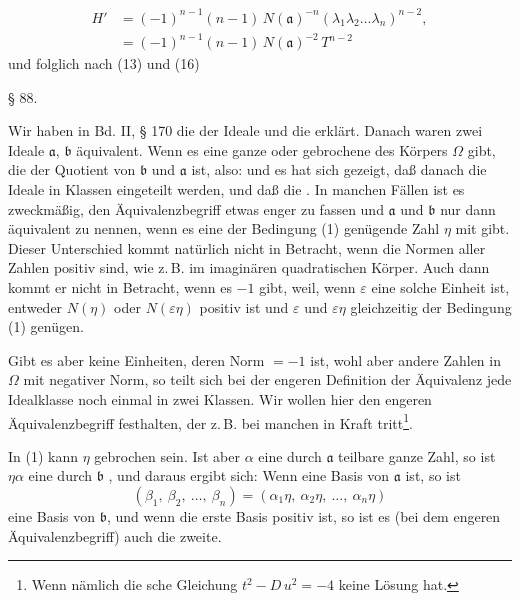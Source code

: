 \[
\begin{aligned}
H' &= (-1)^{n-1}(n-1)\,N(\mathfrak{a})^{-n}(\lambda_1\lambda_2\ldots\lambda_n)^{n-2}, \\
&= (-1)^{n-1}(n-1)\,N(\mathfrak{a})^{-2}\,T^{n-2}
\end{aligned}
\]
und folglich nach (13) und (16)

\begin{center}
§ 88. 
\end{center}

Wir haben in Bd. II, § 170 die  der Ideale und die  erklärt. Danach waren zwei Ideale $\mathfrak{a}$, $\mathfrak{b}$ äquivalent. Wenn es eine ganze oder gebrochene  des Körpers $\Omega$ gibt, die der Quotient von $\mathfrak{b}$ und $\mathfrak{a}$ ist, also:
und es hat sich gezeigt, daß danach die Ideale in Klassen eingeteilt werden, und daß die . In manchen Fällen ist es zweckmäßig, den Äquivalenzbegriff etwas enger zu fassen und $\mathfrak{a}$ und $\mathfrak{b}$ nur dann äquivalent zu nennen, wenn es eine der Bedingung (1) genügende Zahl $\eta$ mit  gibt. Dieser Unterschied kommt natürlich nicht in Betracht, wenn die Normen aller Zahlen positiv sind, wie z.\,B. im imaginären quadratischen Körper. Auch dann kommt er nicht in Betracht, wenn es  $-1$ gibt, weil, wenn $\varepsilon$ eine solche Einheit ist, entweder $N(\eta)$ oder $N(\varepsilon\eta)$ positiv ist und $\varepsilon$ und $\varepsilon\eta$ gleichzeitig der Bedingung (1) genügen.

Gibt es aber keine Einheiten, deren Norm $=-1$ ist, wohl aber andere Zahlen in $\Omega$ mit negativer Norm, so teilt sich bei der engeren Definition der Äquivalenz jede Idealklasse noch einmal in zwei Klassen. Wir wollen hier den engeren Äquivalenzbegriff festhalten, der z.\,B. bei manchen  in Kraft tritt\footnote{Wenn nämlich die sche Gleichung $t^2 - D\,u^2 = -4$ keine Lösung hat.}.

In (1) kann $\eta$ gebrochen sein. Ist aber $\alpha$ eine durch $\mathfrak{a}$ teilbare ganze Zahl, so ist $\eta\alpha$ eine durch $\mathfrak{b}$ , und daraus ergibt sich: Wenn
eine Basis von $\mathfrak{a}$ ist, so ist
\[
(\beta_1,\ \beta_2,\ \ldots,\ \beta_n) = (\alpha_1\eta,\ \alpha_2\eta,\ \ldots,\ \alpha_n\eta)
\]
eine Basis von $\mathfrak{b}$, und wenn die erste Basis positiv ist, so ist es (bei dem engeren Äquivalenzbegriff) auch die zweite.
